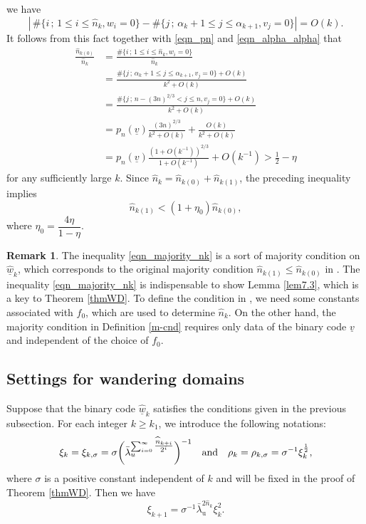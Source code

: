 \documentclass{amsart}
\theoremstyle{definition}
\newtheorem{rmk}[thm]{Remark}
\numberwithin{equation}{section}
\numberwithin{figure}{section}
\begin{document}
we have 
$$\left|\,\#\bigl\{i\,;\,1\leq i\leq \widehat n_k,w_i=0\bigr\}-\#\bigl\{j\,;\,\alpha_k+1\leq j\leq \alpha_{k+1},v_j=0\bigr\}\right|=O(k).$$
It follows from this fact together with \eqref{eqn_pn} and \eqref{eqn_alpha_alpha} that  
\begin{align*}
\frac{\widehat n_{k(0)}}{\widehat n_k}&=
\frac{\#\bigl\{i\,;\,1\leq i\leq \widehat n_k,w_i=0\bigr\}}{\widehat n_k}\\
&=
\frac{\#\bigl\{j\,;\,\alpha_k+1\leq j\leq \alpha_{k+1},v_j=0\bigr\}+O(k)}{k^2+O(k)}\\
&=\frac{\#\{j\,;\, n-(3n)^{2/3}< j\leq n, v_j=0\}+O(k)}{k^2+O(k)}\\
&=p_n(\underline v)\frac{(3n)^{2/3}}{k^2+O(k)}+\frac{O(k)}{k^2+O(k)}\\
&=p_n(\underline v)\frac{\left(1+O(k^{-1})\right)^{2/3}}{1+O(k^{-1})}+O(k^{-1})
>\frac12-\eta
\end{align*}
for any sufficiently large $k$.
Since 
$\widehat n_{k}=\widehat n_{k(0)}+\widehat n_{k(1)}$, 
the preceding inequality implies  
\begin{equation}\label{eqn_majority_nk}
\widehat n_{k(1)}<(1+\eta_0)\widehat n_{k(0)}, 
\end{equation}
where $\eta_0=\dfrac{4\eta}{1-\eta}$.



\begin{rmk}\label{r_majority}
The inequality \eqref{eqn_majority_nk} is a sort of majority condition on $\widehat{\underline{w}}_k$,  
which corresponds to the original majority condition $\widehat n_{k(1)}\leq \widehat n_{k(0)}$ in \cite[(4.1b)]{KNS23}.
The inequality \eqref{eqn_majority_nk} is indispensable to show Lemma \ref{lem7.3}, which 
is a key to Theorem \ref{thmWD}. 
To define the condition in \cite{KNS23}, we need some constants associated with $f_0$, 
which are used to determine $\widehat n_k$.
On the other hand, the majority condition in Definition \ref{m-cnd} requires only data of the binary code 
$\underline v$ and independent of the choice of $f_0$.
\end{rmk}



\subsection{Settings for wandering domains}\label{ss_setting_WD}
Suppose that the binary code $\widehat{\underline{w}}_k$ satisfies the conditions given in the previous subsection.
For each integer $k\geq k_1$, we introduce the following notations:
\begin{equation}\label{eqn_xi_zeta}
\xi_{k}\index{xik@$\xi_k$}=\xi_{k,\sigma}=\sigma\biggl(\bar{\lambda}_{\rm u}^{\sum_{i=0}^{\infty} \tfrac{\widehat n_{k+i}}{2^{i}}} \biggr)^{-1}
\quad\text{and}\quad
\rho_{k}\index{rhok@$\rho_k$}=\rho_{k,\sigma}=\sigma^{-1}\xi_k^{\frac12},
\end{equation}
where $\sigma$ is a positive constant independent of $k$ and will be fixed 
in the proof of Theorem \ref{thmWD}.
Then we have 
\begin{equation}\label{eqn_xi_al_xi}
\xi_{k+1}=\sigma^{-1}\bar\lambda_{\mathrm{u}}^{2\widehat n_k}\xi_k^2.
\end{equation}
\end{document}
